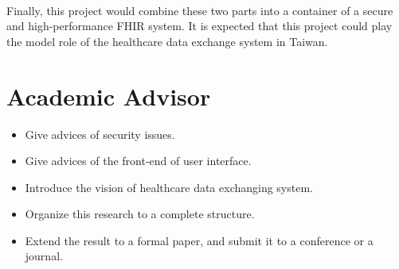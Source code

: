 \documentclass[12pt,a4paper]{article}
\begin{document}
\paragraph{}
Finally, this project would combine these two parts into a container of a secure and
high-performance FHIR system. It is expected that this project could play the model role of the
healthcare data exchange system in Taiwan.

\printbibliography[heading=bibnumbered]

\section{Academic Advisor}
\begin{itemize}
  \item Give advices of security issues.
  \item Give advices of the front-end of user interface.
  \item Introduce the vision of healthcare data exchanging system.
  \item Organize this research to a complete structure.
  \item Extend the result to a formal paper, and submit it to a conference or a journal.
\end{itemize}
\end{document}

